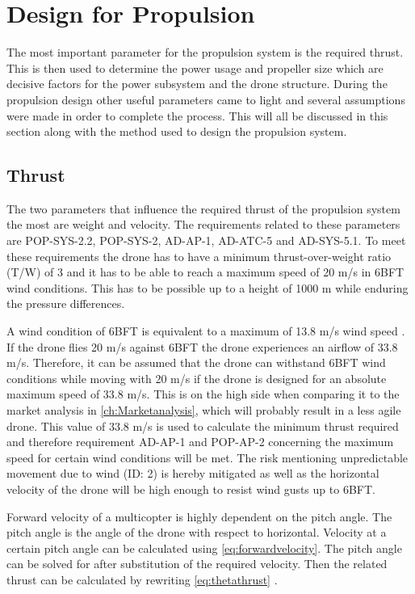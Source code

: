 \section{Design for Propulsion}
\label{sec:propcalc}

The most important parameter for the propulsion system is the required thrust. This is then used to determine the power usage and propeller size which are decisive factors for the power subsystem and the drone structure. During the propulsion design other useful parameters came to light and several assumptions were made in order to complete the process. This will all be discussed in this section along with the method used to design the propulsion system.

\subsection{Thrust}
\label{subsec:Thrust}
The two parameters that influence the required thrust of the propulsion system the most are weight and velocity. The requirements related to these parameters are POP-SYS-2.2, POP-SYS-2, AD-AP-1, AD-ATC-5 and AD-SYS-5.1. To meet these requirements the drone has to have a minimum thrust-over-weight ratio (T/W) of 3 and it has to be able to reach a maximum speed of 20 m/s in 6BFT wind conditions. This has to be possible up to a height of 1000 m while enduring the pressure differences. 

A wind condition of 6BFT is equivalent to a maximum of 13.8 m/s wind speed \cite{windscale}. If the drone flies 20 m/s against 6BFT the drone experiences an airflow of 33.8 m/s. Therefore, it can be assumed that the drone can withstand 6BFT wind conditions while moving with 20 m/s if the drone is designed for an absolute maximum speed of 33.8 m/s. This is on the high side when comparing it to the market analysis in \autoref{ch:Marketanalysis}, which will probably result in a less agile drone. This value of 33.8 m/s is used to calculate the minimum thrust required and therefore requirement AD-AP-1 and POP-AP-2 concerning the maximum speed for certain wind conditions will be met. The risk mentioning unpredictable movement due to wind (ID: 2) is hereby mitigated as well as the horizontal velocity of the drone will be high enough to resist wind gusts up to 6BFT.

Forward velocity of a multicopter is highly dependent on the pitch angle. The pitch angle is the angle of the drone with respect to horizontal. Velocity at a certain pitch angle can be calculated using \autoref{eq:forwardvelocity}. The pitch angle can be solved for after substitution of the required velocity. Then the related thrust can be calculated by rewriting \autoref{eq:thetathrust} \cite{Vovasmulticopterdesign}.

